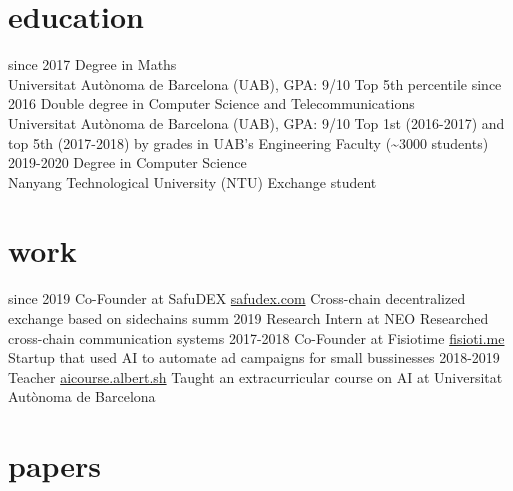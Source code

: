 \documentclass[]{friggeri-cv}
\begin{document}
\section{education}

\begin{entrylist}
  \entry
    {since 2017}
    {Degree in Maths}
    {\\Universitat Autònoma de Barcelona (UAB), GPA: 9/10}
    {Top 5th percentile}
  \entry
    {since 2016}
    {Double degree in Computer Science and Telecommunications}
    {\\Universitat Autònoma de Barcelona (UAB), GPA: 9/10}
    {Top 1st (2016-2017) and top 5th (2017-2018) by grades in UAB’s Engineering Faculty (\textasciitilde3000 students)}
  \entry
    {2019-2020}
    {Degree in Computer Science}
    {\\Nanyang Technological University (NTU)}
    {Exchange student}
\end{entrylist}

\section{work}

\begin{entrylist}
  \entry
    {since 2019}
    {Co-Founder at SafuDEX}
    {\href{https://safudex.com}{safudex.com}}
    {Cross-chain decentralized exchange based on sidechains}
  \entry
    {summ 2019}
    {Research Intern at NEO}
    {}
    {Researched cross-chain communication systems}
  \entry
    {2017-2018}
    {Co-Founder at Fisiotime}
    {\href{http://fisioti.me}{fisioti.me}}
    {Startup that used AI to automate ad campaigns for small bussinesses}
  \entry
    {2018-2019}
    {Teacher}
    {\href{https://aicourse.albert.sh}{aicourse.albert.sh}}
    {Taught an extracurricular course on AI at Universitat Autònoma de Barcelona}
\end{entrylist}

\section{papers}
\end{document}
